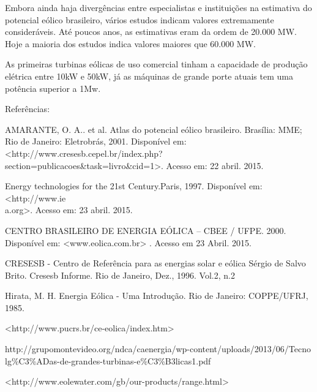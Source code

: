 \documentclass[12pt,openright,oneside,a4paper,brazil]{abntex2}
\begin{document}
Embora ainda haja divergências entre especialistas e instituições na estimativa do potencial eólico brasileiro, vários estudos indicam valores extremamente consideráveis. Até poucos anos, as estimativas eram da ordem de 20.000 MW. Hoje a maioria dos estudos indica valores maiores que 60.000 MW.

As primeiras turbinas eólicas de uso comercial tinham a capacidade de produção elétrica entre 10kW e 50kW, já as máquinas de grande porte atuais tem uma potência superior a 1Mw. 

\newpage
Referências:

AMARANTE, O. A.. et al. Atlas do potencial eólico brasileiro. Brasília: MME; Rio de Janeiro: Eletrobrás, 2001. Disponível em:<http://www.cresesb.cepel.br/index.php?\\section=publicacoes\&task=livro\&cid=1>. Acesso em: 22 abril. 2015.

Energy technologies for the 21st Century.Paris, 1997. Disponível em:<http://www.ie\\a.org>. Acesso em: 23 abril. 2015.

CENTRO BRASILEIRO DE ENERGIA EÓLICA – CBEE / UFPE. 2000. Disponível em: <www.eolica.com.br> . Acesso em 23 Abril. 2015.

CRESESB - Centro de Referência para as energias solar e eólica Sérgio de Salvo Brito. Cresesb Informe. Rio de Janeiro, Dez., 1996. Vol.2, n.2

Hirata, M. H. Energia Eólica - Uma Introdução. Rio de Janeiro: COPPE/UFRJ, 1985.

<http://www.pucrs.br/ce-eolica/index.htm>

http://grupomontevideo.org/ndca/caenergia/wp-content/uploads/2013/06/Tecno\\lg\%C3\%ADas-de-grandes-turbinas-e\%C3\%B3licas1.pdf

<http://www.eolewater.com/gb/our-products/range.html>
\end{document}
